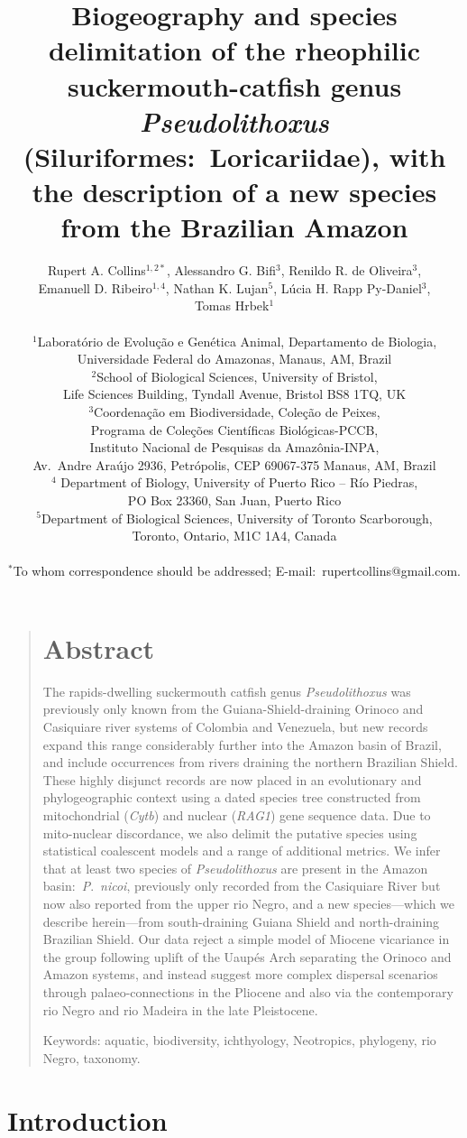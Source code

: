 \documentclass[12pt]{article}
\title{Biogeography and species delimitation of the rheophilic suckermouth-catfish genus \emph{Pseudolithoxus} (Siluriformes:\ Loricariidae), with the description of a new species from the Brazilian Amazon}
\author
{Rupert A. Collins$^{1,2\ast}$, Alessandro G. Bifi$^{3}$,  Renildo R. de Oliveira$^{3}$,\\ Emanuell D. Ribeiro$^{1,4}$, Nathan K. Lujan$^{5}$, Lúcia H. Rapp Py-Daniel$^{3}$,\\ Tomas Hrbek$^{1}$ \\
\\
\small{$^{1}$Laboratório de Evolução e Genética Animal, Departamento de Biologia,}\\
\small{Universidade Federal do Amazonas, Manaus, AM, Brazil}\\
\small{$^{2}$School of Biological Sciences, University of Bristol,}\\
\small{Life Sciences Building, Tyndall Avenue, Bristol BS8 1TQ, UK}\\
\small{$^{3}$Coordenação em Biodiversidade, Coleção de Peixes,}\\
\small{Programa de Coleções Científicas Biológicas-PCCB,}\\
\small{Instituto Nacional de Pesquisas da Amazônia-INPA,}\\
\small{Av.\ Andre Araújo 2936, Petrópolis, CEP 69067-375 Manaus, AM, Brazil}\\
\small{$^{4}$ Department of Biology, University of Puerto Rico -- Río Piedras,}\\
\small{PO Box 23360, San Juan, Puerto Rico}\\
\small{$^{5}$Department of Biological Sciences, University of Toronto Scarborough,}\\
\small{Toronto, Ontario, M1C 1A4, Canada}\\
\\
\normalsize{$^\ast$To whom correspondence should be addressed; E-mail:\ rupertcollins@gmail.com.}
}
\date{}
\newenvironment{sciabstract}{%
\begin{quote} \bf}
{\end{quote}}
\begin{document}
 

\baselineskip24pt

\maketitle 
\newpage
\linenumbers
\begin{sciabstract}
\section*{Abstract}
The rapids-dwelling suckermouth catfish genus \emph{Pseudolithoxus} was previously only known from the Guiana-Shield-draining Orinoco and Casiquiare river systems of Colombia and Venezuela, but new records expand this range considerably further into the Amazon basin of Brazil, and include occurrences from rivers draining the northern Brazilian Shield. %
These highly disjunct records are now placed in an evolutionary and phylogeographic context using a dated species tree constructed from mitochondrial (\emph{Cytb}) and nuclear (\emph{RAG1}) gene sequence data. %
Due to mito-nuclear discordance, we also delimit the putative species using statistical coalescent models and a range of additional metrics. %
We infer that at least two species of \emph{Pseudolithoxus} are present in the Amazon basin:\ \emph{P}.\ \emph{nicoi}, previously only recorded from the Casiquiare River but now also reported from the upper rio Negro, and a new species---which we describe herein---from south-draining Guiana Shield and north-draining Brazilian Shield. %
Our data reject a simple model of Miocene vicariance in the group following uplift of the Uaupés Arch separating the Orinoco and Amazon systems, and instead suggest more complex dispersal scenarios through palaeo-connections in the Pliocene and also via the contemporary rio Negro and rio Madeira in the late Pleistocene.%

\bigskip
Keywords: aquatic, biodiversity, ichthyology, Neotropics, phylogeny, rio Negro, taxonomy.
\end{sciabstract}

\newpage
\section*{Introduction}
\end{document}
